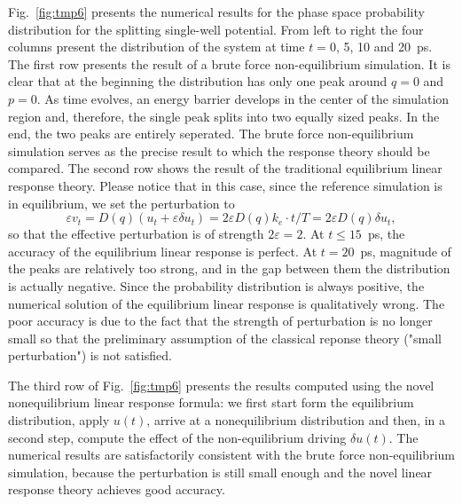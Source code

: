 \documentclass[]{tMPH2e}
\newcommand{\eps}{\varepsilon}
\newcommand{\mt}{\mathcal T}
\begin{document}
Fig.~\ref{fig:tmp6} presents the numerical results for  the phase space probability distribution for the splitting
single-well potential. From left to right the four columns present the
distribution of the system at time $t = 0$, 5, 10 and 20~\textsf{ps}. The first
row presents the result of a brute force non-equilibrium simulation.  It is clear
that at the beginning the distribution has only one peak around $q = 0$ and $p = 0$. As  time evolves, an energy barrier develops
in the center of the simulation region and, therefore, the single peak
splits into two equally sized peaks.  In the end, the two
peaks are entirely seperated.  The brute force non-equilibrium
simulation serves as the precise result to which the response theory
should be compared. The second row shows the result of the
traditional equilibrium linear response theory.  Please notice that in
this case, since the reference simulation is in equilibrium, we set the perturbation to
\[
\eps v_t = D(q) (u_t+\eps\delta u_t)=2\eps D(q)k_e\cdot t/T=2\eps D(q)\delta u_t,
\] 
so that the effective perturbation is of strength $2\eps = 2$.  At $t \leq
15$~\textsf{ps}, the accuracy of the equilibrium linear response is
perfect. At $t =
20$~\textsf{ps}, magnitude of the peaks are relatively too strong,
and in the gap between them the distribution is actually negative.
Since the probability distribution is always positive, the
numerical solution of the equilibrium linear response is qualitatively wrong.
The poor accuracy is due to the fact that the strength of perturbation is no
longer small so that the preliminary assumption of the classical reponse theory ("small perturbation")
is not satisfied.  

The third row of Fig.~\ref{fig:tmp6} presents the results computed using the novel nonequilibrium  linear response formula: we first start form the equilibrium distribution, apply  $u(t)$, arrive at a nonequilibrium distribution and then, in a second step, compute the effect of the non-equilibrium driving $\delta u(t)$.  The numerical results are satisfactorily consistent with
the brute force non-equilibrium simulation, because the perturbation is still  small enough and the novel linear response theory achieves
good accuracy.

\end{document}
